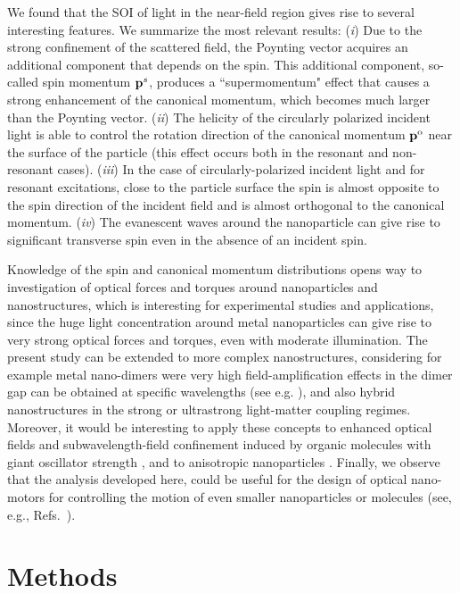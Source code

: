\documentclass[journal=apchd5,manuscript=article]{achemso}
\begin{document}
We found that the SOI of light in the near-field region gives rise to several interesting features. We summarize the most relevant results:
({\it i}) Due to the strong confinement of the scattered field, the Poynting vector acquires an additional component that depends on the spin. This additional component, so-called spin momentum ${\bf p}^s$, produces a ``supermomentum" effect that causes a strong enhancement of the canonical momentum, which becomes much larger than the Poynting vector.
({\it ii}) The helicity of the circularly polarized incident light is able to control the rotation direction of the canonical momentum ${\bf p}^{\rm o}$ near the surface of the particle (this effect occurs both in the resonant and non-resonant cases).
({\it iii})  In the case of circularly-polarized incident light and for resonant excitations, close to the particle surface the spin is almost opposite to the spin direction of the incident field and is almost orthogonal to the canonical momentum.
({\it iv}) The evanescent waves around the nanoparticle can give rise to significant transverse spin even in the absence of an incident spin. 

Knowledge of the spin and canonical momentum distributions opens way to investigation of optical forces and torques around nanoparticles and nanostructures, which is interesting for experimental studies and applications, since the huge light concentration around metal nanoparticles can give rise to very strong optical forces and torques, even with moderate illumination. The present study can be extended to more complex nanostructures, considering for example metal nano-dimers were very high field-amplification effects in the dimer gap can be obtained at specific wavelengths (see e.g. \cite{nordlander2004plasmon}), and also hybrid nanostructures in the strong \cite{Savasta2010,Ridolfo2011} or ultrastrong \cite{Cacciola2014} light-matter coupling regimes. Moreover, it would be interesting to apply these concepts to  enhanced optical fields and subwavelength-field confinement induced by organic molecules with giant oscillator strength \cite{Gentile2014, Cacciola2015}, and to anisotropic nanoparticles \cite{Bliokh2016}.
Finally, we observe that the analysis developed here, could be useful for the design of optical nano-motors for controlling the motion of even smaller nanoparticles  or molecules (see, e.g., Refs.~). 


\section{Methods}
\end{document}
